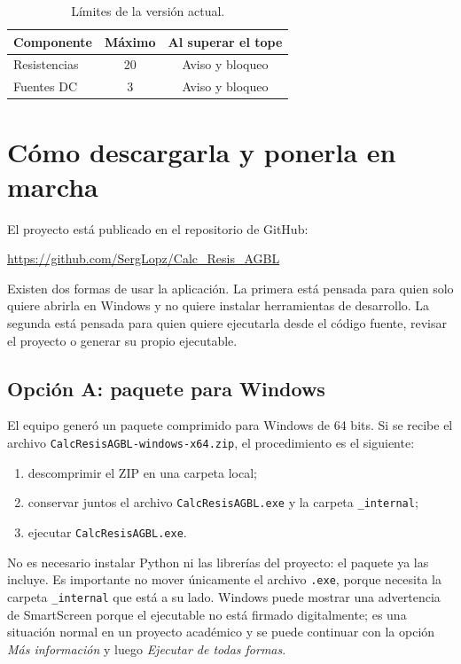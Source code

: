 \documentclass[journal]{IEEEtran}
\begin{document}
\begin{table}[t]
  \caption{Límites de la versión actual.}
  \label{tab:limites}
  \centering
  \small
  \begin{tabular}{@{}lcc@{}}
    \hline
    Componente & Máximo & Al superar el tope \\
    \hline
    Resistencias & 20 & Aviso y bloqueo \\
    Fuentes DC & 3 & Aviso y bloqueo \\
    \hline
  \end{tabular}
\end{table}

\clearpage
\section{Cómo descargarla y ponerla en marcha}
\label{sec:descarga}

El proyecto está publicado en el repositorio de GitHub:
\begin{center}
  \url{https://github.com/SergLopz/Calc_Resis_AGBL}
\end{center}

Existen dos formas de usar la aplicación. La primera está pensada para quien solo quiere abrirla en Windows y no quiere instalar herramientas de desarrollo. La segunda está pensada para quien quiere ejecutarla desde el código fuente, revisar el proyecto o generar su propio ejecutable.

\subsection{Opción A: paquete para Windows}

El equipo generó un paquete comprimido para Windows de 64 bits. Si se recibe el archivo \texttt{CalcResisAGBL-windows-x64.zip}, el procedimiento es el siguiente:
\begin{enumerate}
  \item descomprimir el ZIP en una carpeta local;
  \item conservar juntos el archivo \texttt{CalcResisAGBL.exe} y la carpeta \texttt{\_internal};
  \item ejecutar \texttt{CalcResisAGBL.exe}.
\end{enumerate}

No es necesario instalar Python ni las librerías del proyecto: el paquete ya las incluye. Es importante no mover únicamente el archivo \texttt{.exe}, porque necesita la carpeta \texttt{\_internal} que está a su lado. Windows puede mostrar una advertencia de SmartScreen porque el ejecutable no está firmado digitalmente; es una situación normal en un proyecto académico y se puede continuar con la opción \emph{Más información} y luego \emph{Ejecutar de todas formas}.
\end{document}
